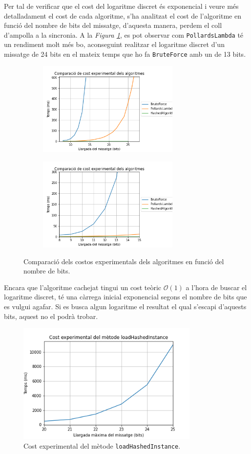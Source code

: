 Per tal de verificar que el cost del logaritme discret és exponencial i veure més detalladament el cost de cada algoritme, s'ha analitzat el cost de l'algoritme en funció del nombre de bits del missatge, d'aquesta manera, perdem el coll d'ampolla a la sincronia. A la \textit{Figura \ref{fig:cost-algo}}, es pot observar com \texttt{PollardsLambda} té un rendiment molt més bo, aconseguint realitzar el logaritme discret d'un missatge de 24 bits en el mateix temps que ho fa \texttt{BruteForce} amb un de 13 bits.
\begin{figure}[H]
	\centering
	\begin{subfigure}[b]{0.48\textwidth}
		\centering
		\includegraphics[width=7cm]{imgs/cost/algoritmes-cost.png}
	\end{subfigure}
	\begin{subfigure}[b]{0.48\textwidth}
	\centering
	\includegraphics[width=7cm]{imgs/cost/algoritmes-cost2.png}
	\end{subfigure}
	\caption{Comparació dels costos experimentals dels algoritmes en funció del nombre de bits.}
	\label{fig:cost-algo}
\end{figure}
Encara que l'algoritme cachejat tingui un cost teòric $\mathcal{O}(1)$ a l'hora de buscar el logaritme discret, té una càrrega inicial exponencial segons el nombre de bits que es vulgui agafar. Si es busca algun logaritme el resultat el qual s'escapi d'aquests bits, aquest no el podrà trobar.
\begin{figure}[H]
	\centering
	\includegraphics[width=9cm]{imgs/cost/pollardslambda.png}
	\caption{Cost experimental del mètode \texttt{loadHashedInstance}.}
	\label{fig:pollardslambda}
\end{figure}

